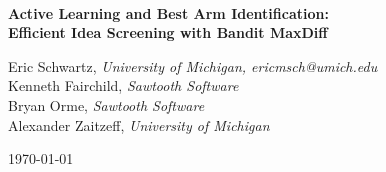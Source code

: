 \documentclass[nonblindrev]{informs3}
\newcommand{\titleofthispaper}{
	\textbf{Active Learning and Best Arm Identification: \\
	Efficient Idea Screening with Bandit MaxDiff} 
}
\begin{document}

\begin{center}

	~ \\

	\vspace{2in}

	\titleofthispaper

	\vspace{1in}

	{Eric Schwartz,}
	\emph{University of Michigan, {ericmsch@umich.edu} } \\
	{Kenneth Fairchild,} 
	\emph{Sawtooth Software} \\
	{Bryan Orme,}
	\emph{Sawtooth Software} \\
	{Alexander Zaitzeff,}
	\emph{University of Michigan} 

	\vspace{1in}

	\today


\end{center}







\end{document}
